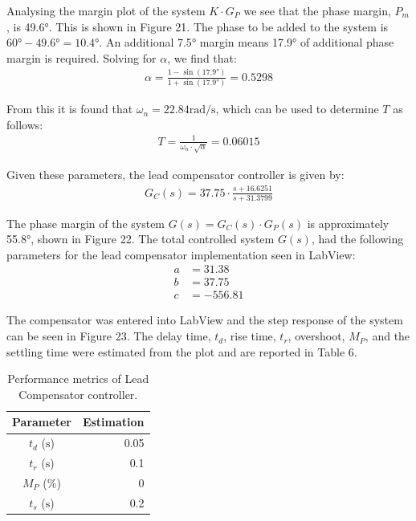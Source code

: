 \documentclass{article}
\begin{document}
Analysing the margin plot of the system $K \cdot G_P$ we see that the phase margin, $P_m$, is 49.6$\si{\degree}$. This is shown in Figure 21. The phase to be added to the system is $60\si{\degree} - 49.6\si{\degree} = 10.4\si{\degree}$. An additional 7.5$\si{\degree}$ margin means 17.9$\si{\degree}$ of additional phase margin is required. Solving for $\alpha$, we find that:
\begin{align*}
	\alpha = \frac{1 - \sin(17.9 \si{\degree})}{1 + \sin(17.9 \si{\degree})} = 0.5298
\end{align*}

From this it is found that $\omega_n = 22.84\si{\radian\per\second}$, which can be used to determine $T$ as follows:
\begin{align*}
	T = \frac{1}{\omega_n \cdot \sqrt{\alpha}} = 0.06015
\end{align*}

Given these parameters, the lead compensator controller is given by:
\begin{align}
	G_C(s) = 37.75 \cdot \frac{s + 16.6251}{s + 31.3799}
\end{align}

The phase margin of the system $G(s) = G_C(s) \cdot G_P(s)$ is approximately 55.8$\si{\degree}$, shown in Figure 22. The total controlled system $G(s)$, had the following parameters for the lead compensator implementation seen in LabView:
\begin{align*}
	a &= 31.38\\
	b &= 37.75\\
	c &= -556.81
\end{align*}

The compensator was entered into LabView and the step response of the system can be seen in Figure 23. The delay time, $t_d$, rise time, $t_r$, overshoot, $M_P$, and the settling time were estimated from the plot and are reported in Table 6.

\begin{table}[H]
	\centering
	\caption{Performance metrics of Lead Compensator controller.}
	\begin{tabular}{cr}
		\toprule
		\textbf{Parameter} & \textbf{Estimation}\\
		\midrule
		$t_d$ ($\si{\second}$) & 0.05 \\
		$t_r$ ($\si{\second}$) & 0.1 \\
		$M_P$ (\%) & 0 \\
		$t_s$ ($\si{\second}$) & 0.2 \\
		\bottomrule
	\end{tabular}
\end{table}
\end{document}
